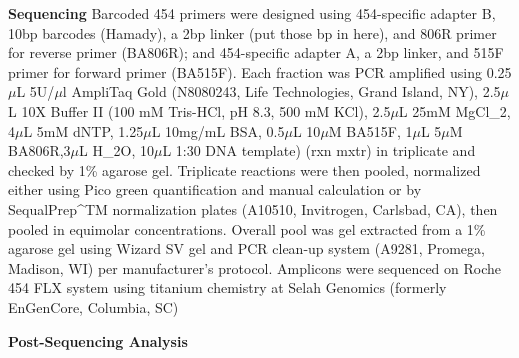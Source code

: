 \textbf{Sequencing}  Barcoded 454 primers were designed using 454-specific adapter B, 10bp barcodes (Hamady), a 2bp linker (put those bp in here), and 806R primer for reverse primer (BA806R); and 454-specific adapter A, a 2bp linker, and 515F primer for forward primer (BA515F). Each fraction was PCR amplified using 0.25$\mu$L 5U/$\mu$l AmpliTaq Gold (N8080243, Life Technologies, Grand Island, NY), 2.5$\mu$L 10X Buffer II (100 mM Tris-HCl, pH 8.3, 500 mM KCl), 2.5$\mu$L 25mM MgCl_{2}, 4$\mu$L 5mM dNTP, 1.25$\mu$L 10mg/mL BSA, 0.5$\mu$L 10$\mu$M BA515F, 1$\mu$L 5$\mu$M BA806R,3$\mu$L H_{2}O, 10$\mu$L 1:30 DNA template) (rxn mxtr)  in triplicate and checked by 1\% agarose gel. Triplicate reactions were then pooled, normalized either using Pico green quantification and manual calculation or by SequalPrep^{TM} normalization plates (A10510, Invitrogen, Carlsbad, CA), then pooled in equimolar concentrations.  Overall pool was gel extracted from a 1\% agarose gel using Wizard SV gel and PCR clean-up system (A9281, Promega, Madison, WI) per manufacturer's protocol.  Amplicons were sequenced on Roche 454 FLX system using titanium chemistry at Selah Genomics (formerly EnGenCore, Columbia, SC)    

\textbf{Post-Sequencing Analysis}
 